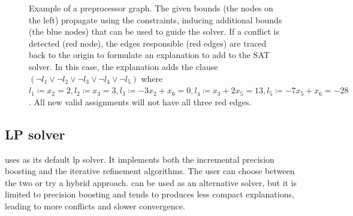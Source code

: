 \documentclass[runningheads]{llncs}
\begin{document}
\begin{figure}[h]
    \caption{Example of a preprocessor graph. The given bounds (the nodes on the left) propagate using the constraints, inducing additional bounds (the blue nodes) that can be used to guide the solver.
        If a conflict is detected (red node), the edges responsible (red edges) are traced back to the origin to formulate an explanation to add to the SAT solver.
        In this case, the explanation adds the clause $(\neg l_1 \lor \neg l_2 \lor \neg l_3 \lor \neg l_4 \lor \neg l_5)$ where $l_1 \coloneqq x_2 = 2, l_2 \coloneqq x_3 = 3, l_3 \coloneqq -3x_2 + x_6 = 0, l_4 \coloneqq x_3 + 2x_5 = 13, l_5 \coloneqq -7x_5 + x_6 = -28$.
        All new valid assignments will not have all three red edges.}
    \label{dg:preprocessor}
\end{figure}

\subsection{LP solver}

\dlinear uses \soplex as its default \gls{lp} solver.
It implements both the incremental precision boosting and the iterative refinement algorithms.
The user can choose between the two or try a hybrid approach.
\qsoptex can be used as an alternative solver, but it is limited to precision boosting and tends to produces less compact explanations, leading to more conflicts and slower convergence.
\end{document}
